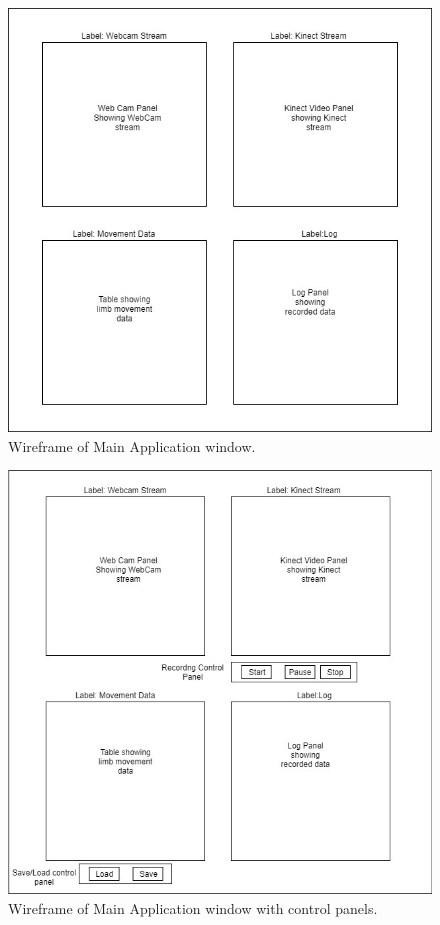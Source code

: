 \documentclass[a4paper, 12pt]{article}
\begin{document}
\begin{figure}
  \begin{center}
  \includegraphics[scale=0.7]{appgui.jpg}
  	\caption{Wireframe of Main Application window.}
  \end{center} 
  \label{fig:appgui} 
\end{figure}

\begin{figure}
  \begin{center}
  \includegraphics[scale=0.7]{appgui2.jpg}
  	\caption{Wireframe of Main Application window with control panels.}
  \end{center} 
  \label{fig:appgui2} 
\end{figure}
\end{document}
